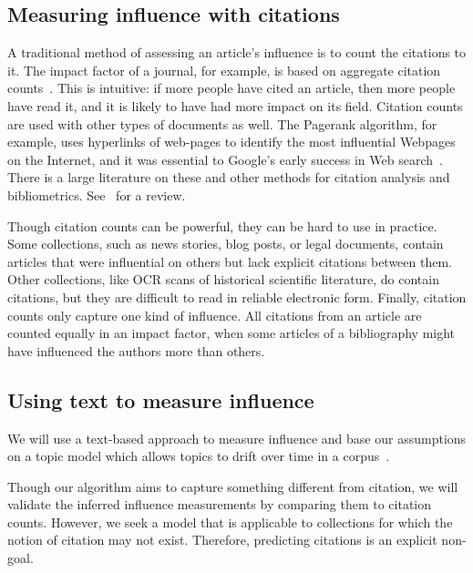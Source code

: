 \subsection*{Measuring influence with citations}

A traditional method of assessing an article's influence is to count
the citations to it. The impact factor of a journal, for example, is
based on aggregate citation counts~\cite{garfield:2002}.  This is
intuitive: if more people have cited an article, then more people have
read it, and it is likely to have had more impact on its field.
Citation counts are used with other types of documents as well.  The
Pagerank algorithm, for example, uses hyperlinks of web-pages to
identify the most influential Webpages on the Internet, and it was
essential to Google's early success in Web search~\cite{brin:1998}.
There is a large literature on these and other methods for citation
analysis and bibliometrics.  See~\cite{osareh:1996} for a review.

Though citation counts can be powerful, they can be hard to use in
practice.  Some collections, such as news stories, blog posts, or
legal documents, contain articles that were influential on others but
lack explicit citations between them.  Other collections, like OCR
scans of historical scientific literature, do contain citations, but
they are difficult to read in reliable electronic form.  Finally,
citation counts only capture one kind of influence.  All citations
from an article are counted equally in an impact factor, when some
articles of a bibliography might have influenced the authors more than
others.

\subsection*{Using text to measure influence}

We will use a text-based approach to measure influence and base our
assumptions on a topic model which allows topics to drift over time in
a corpus~\cite{blei:2006}.

Though our algorithm aims to capture something different from
citation, we will validate the inferred influence measurements by
comparing them to citation counts.  However, we seek a model that is
applicable to collections for which the notion of citation may not
exist.  Therefore, predicting citations is an explicit non-goal. 

